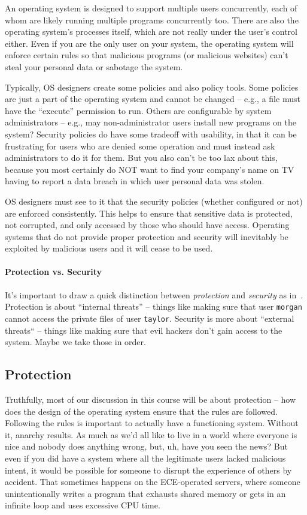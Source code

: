 An operating system is designed to support multiple users concurrently, each of whom are likely running multiple programs concurrently too. There are also the operating system's processes itself, which are not really under the user's control either. Even if you are the only user on your system, the operating system will enforce certain rules so that malicious programs (or malicious websites) can't steal your personal data or sabotage the system. 

Typically, OS designers create some policies and also policy tools. Some policies are just a part of the operating system and cannot be changed -- e.g., a file must have the ``execute'' permission to run. Others are configurable by system administrators -- e.g., may non-administrator users install new programs on the system? Security policies do have some tradeoff with usability, in that it can be frustrating for users who are denied some operation and must instead ask administrators to do it for them. But you also can't be too lax about this, because you most certainly do NOT want to find your company's name on TV having to report a data breach in which user personal data was stolen.

OS designers must see to it that the security policies (whether configured or not) are enforced consistently. This helps to ensure that sensitive data is protected, not corrupted, and only accessed by those who should have access. Operating systems that do not provide proper protection and security will inevitably be exploited by malicious users and it will cease to be used. 

\paragraph{Protection vs. Security} It's important to draw a quick distinction between \textit{protection} and \textit{security} as in~\cite{osc}. Protection is about ``internal threats'' -- things like making sure that user \texttt{morgan} cannot access the private files of user \texttt{taylor}. Security is more about ``external threats`` -- things like making sure that evil hackers don't gain access to the system. Maybe we take those in order.

\subsection*{Protection}
Truthfully, most of our discussion in this course will be about protection -- how does the design of the operating system ensure that the rules are followed. Following the rules is important to actually have a functioning system. Without it, anarchy results. As much as we'd all like to live in a world where everyone is nice and nobody does anything wrong, but, uh, have you seen the news? But even if you did have a system where all the legitimate users lacked malicious intent, it would be possible for someone to disrupt the experience of others by accident. That sometimes happens on the ECE-operated servers, where someone unintentionally writes a program that exhausts shared memory or gets in an infinite loop and uses excessive CPU time.

